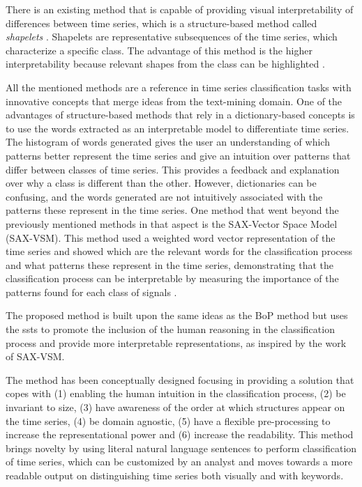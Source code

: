 \par
There is an existing method that is capable of providing visual interpretability of differences between time series, which is a structure-based method called \textit{shapelets} \cite{shapelets}. Shapelets are representative subsequences of the time series, which characterize a specific class. The advantage of this method is the higher interpretability because relevant shapes from the class can be highlighted \cite{shapelets}. 
\par
All the mentioned methods are a reference in time series classification tasks with innovative concepts that merge ideas from the text-mining domain. One of the advantages of structure-based methods that rely in a dictionary-based concepts is to use the words extracted as an interpretable model to differentiate time series. The histogram of words generated gives the user an understanding of which patterns better represent the time series and give an intuition over patterns that differ between classes of time series. This provides a feedback and explanation over why a class is different than the other. However, dictionaries can be confusing, and the words generated are not intuitively associated with the patterns these represent in the time series. One method that went beyond the previously mentioned methods in that aspect is the SAX-Vector Space Model (SAX-VSM)\cite{sax_vsm}. This method used a weighted word vector representation of the time series and showed which are the relevant words for the classification process and what patterns these represent in the time series, demonstrating that the classification process can be interpretable by measuring the importance of the patterns found for each class of signals \cite{sax_vsm}. 
\par
The proposed method is built upon the same ideas as the BoP method but uses the \gls{ssts} to promote the inclusion of the human reasoning in the classification process and provide more interpretable representations, as inspired by the work of SAX-VSM.
\par
The method has been conceptually designed focusing in providing a solution that copes with (1) enabling the human intuition in the classification process, (2) be invariant to size, (3) have awareness of the order at which structures appear on the time series, (4) be domain agnostic, (5) have a flexible pre-processing to increase the representational power and (6) increase the readability. This method brings novelty by using literal natural language sentences to perform classification of time series, which can be customized by an analyst and moves towards a more readable output on distinguishing time series both visually and with keywords.

